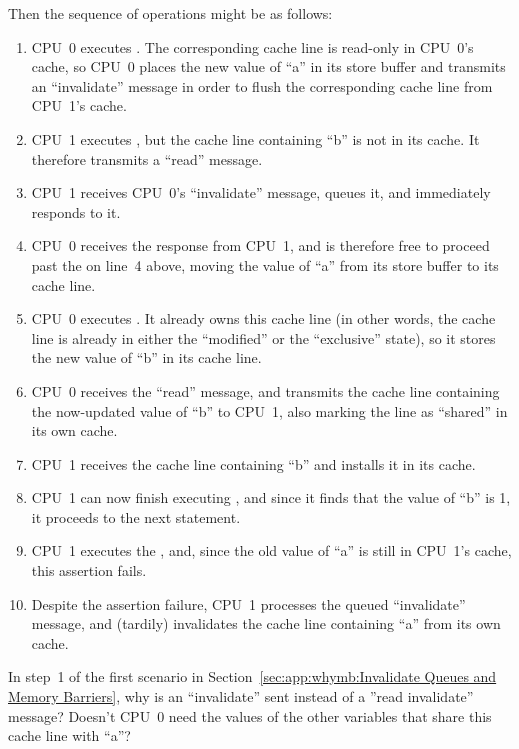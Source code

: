 Then the sequence of operations might be as follows:
\begin{enumerate}
\item	CPU~0 executes .  The corresponding
	cache line is read-only in
	CPU~0's cache, so CPU~0 places the new value of ``a'' in its
	store buffer and transmits an ``invalidate'' message in order
	to flush the corresponding cache line from CPU~1's cache.
\item	CPU~1 executes , but the cache line
	containing ``b'' is not in its cache.
	It therefore transmits a ``read'' message.
\item	CPU~1 receives CPU~0's ``invalidate'' message, queues it, and
	immediately responds to it.
\item	CPU~0 receives the response from CPU~1, and is therefore free
	to proceed past the  on line~4 above, moving
	the value of ``a'' from its store buffer to its cache line.
\item	CPU~0 executes .
	It already owns this cache line (in other words, the cache line
	is already in either the ``modified'' or the ``exclusive'' state),
	so it stores the new value of ``b'' in its cache line.
\item	CPU~0 receives the ``read'' message, and transmits the
	cache line containing the now-updated value of ``b''
	to CPU~1, also marking the line as ``shared'' in its own cache.
\item	CPU~1 receives the cache line containing ``b'' and installs
	it in its cache.
\item	CPU~1 can now finish executing ,
	and since it finds that the value of ``b'' is 1, it proceeds
	to the next statement.
\item	CPU~1 executes the , and, since the
	old value of ``a'' is still in CPU~1's cache,
	this assertion fails.
\item	Despite the assertion failure, CPU~1 processes the queued
	``invalidate'' message, and (tardily)
	invalidates the cache line containing ``a'' from its own cache.
\end{enumerate}

\QuickQuiz{}
	In step~1 of the first scenario in
	Section~\ref{sec:app:whymb:Invalidate Queues and Memory Barriers},
	why is an ``invalidate'' sent instead of a ''read invalidate''
	message?
	Doesn't CPU~0 need the values of the other variables that share
	this cache line with ``a''?
 \QuickQuizEnd

